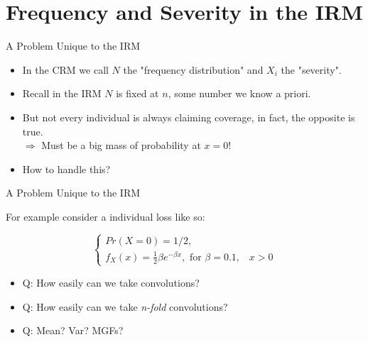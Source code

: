 \documentclass[11pt]{beamer}
\begin{document}
\section{Frequency and Severity in the IRM}
\begin{frame}{ A Problem Unique to the IRM}
  
\begin{itemize}

\item In the CRM we call $N$ the "frequency distribution" and $X_i$ the "severity".

\vfill

\item Recall in the IRM $N$ is fixed at $n$, some number we know a priori.

\vfill

\item But not every individual is always claiming coverage, in fact, the opposite is true. \\
\color {red} $\Rightarrow$ Must be a big mass of probability at $x=0$! \color {black}

\vfill

\item How to handle this?

\end{itemize}  
  
\end{frame}
\begin{frame}{ A Problem Unique to the IRM}

For example consider a individual loss like so:

\vfill 

  $$\left\{\begin{array}{ll}Pr\left( X=0\right) =1/2, \\
      f_X(x) =\frac{1}{2}\beta e^{-\beta x}, \text{ for }\beta =0.1,\;\;\; x>0
    \end{array}\right.$$
    
\vfill    
    
\begin{itemize}
    
\item Q: How easily can we take convolutions?

\item Q: How easily can we take \emph{n-fold} convolutions?

\item Q: Mean? Var? MGFs?    
    
\end{itemize}

\end{frame}
\end{document}
